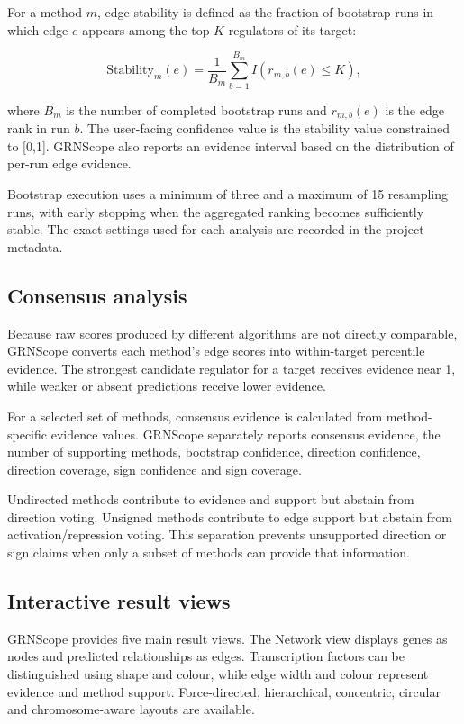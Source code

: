 \documentclass[unnumsec,webpdf,modern,large]{oup-authoring-template}%
\begin{document}
For a method $m$, edge stability is defined as the fraction of bootstrap runs in which edge $e$ appears among the top $K$ regulators of its target:

\begin{equation}
\mathrm{Stability}_m(e)=\frac{1}{B_m}\sum_{b=1}^{B_m} I(r_{m,b}(e)\leq K),
\end{equation}

where $B_m$ is the number of completed bootstrap runs and $r_{m,b}(e)$ is the edge rank in run $b$. The user-facing confidence value is the stability value constrained to [0,1]. GRNScope also reports an evidence interval based on the distribution of per-run edge evidence.

Bootstrap execution uses a minimum of three and a maximum of 15 resampling runs, with early stopping when the aggregated ranking becomes sufficiently stable. The exact settings used for each analysis are recorded in the project metadata.

\subsection{Consensus analysis}

Because raw scores produced by different algorithms are not directly comparable, GRNScope converts each method's edge scores into within-target percentile evidence. The strongest candidate regulator for a target receives evidence near 1, while weaker or absent predictions receive lower evidence.

For a selected set of methods, consensus evidence is calculated from method-specific evidence values. GRNScope separately reports consensus evidence, the number of supporting methods, bootstrap confidence, direction confidence, direction coverage, sign confidence and sign coverage.

Undirected methods contribute to evidence and support but abstain from direction voting. Unsigned methods contribute to edge support but abstain from activation/repression voting. This separation prevents unsupported direction or sign claims when only a subset of methods can provide that information.

\subsection{Interactive result views}

GRNScope provides five main result views. The Network view displays genes as nodes and predicted relationships as edges. Transcription factors can be distinguished using shape and colour, while edge width and colour represent evidence and method support. Force-directed, hierarchical, concentric, circular and chromosome-aware layouts are available.
\end{document}
